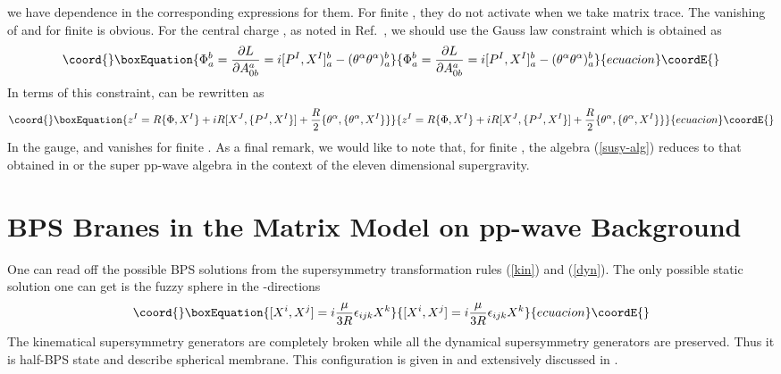 \documentclass[a4paper,12pt]{article}
\begin{document}
we have \coordHE{} dependence in the corresponding expressions for them.  For
finite \coordHE{}, they do not activate when we take matrix trace.  The
vanishing of \coordHE{} and \coordHE{} for finite \coordHE{}
is obvious.  For the central charge \coordHE{}, as noted in
Ref.~\cite{ban157}, we should use the Gauss law constraint \myHighlight{$\Phi$}\coordHE{}
which is obtained as
\begin{equation}\coord{}\boxEquation{
\Phi_a^b = \frac{\partial L }{\partial A_{0b}^a} = i[ P^I, X^I
]_a^b - (\theta^\alpha \theta^\alpha)_a^b
}{
\Phi_a^b = \frac{\partial L }{\partial A_{0b}^a} = i[ P^I, X^I
]_a^b - (\theta^\alpha \theta^\alpha)_a^b
}{ecuacion}\coordE{}\end{equation}
In terms of this constraint, \coordHE{} can be rewritten as
\begin{equation}\coord{}\boxEquation{
z^I  = R \{ \Phi, X^I \} + i R [ X^J, \{ P^J, X^I \} ]
 + \frac{R}{2} \{ \theta^\alpha, \{ \theta^\alpha, X^I \}\}
}{
z^I  = R \{ \Phi, X^I \} + i R [ X^J, \{ P^J, X^I \} ]
 + \frac{R}{2} \{ \theta^\alpha, \{ \theta^\alpha, X^I \}\}
}{ecuacion}\coordE{}\end{equation}
In the \coordHE{} gauge, \coordHE{} and \coordHE{} vanishes for
finite \coordHE{}.  As a final remark, we would like to note that, for
finite \coordHE{}, the algebra (\ref{susy-alg}) reduces to that obtained
in \cite{das185} or the super pp-wave algebra \cite{hat002} in the
context of the eleven dimensional supergravity.



\section{BPS Branes in the Matrix Model on pp-wave Background}
\label{brane}

One can read off the possible BPS solutions from the supersymmetry
transformation rules (\ref{kin}) and (\ref{dyn}). The only
possible static solution one can get is the fuzzy sphere in the
\coordHE{}-directions\cite{ber021}
\begin{equation}\coord{}\boxEquation{
[ X^i, X^j ] = i {\mu \over 3R}\epsilon_{ijk} X^k
}{
[ X^i, X^j ] = i {\mu \over 3R}\epsilon_{ijk} X^k
}{ecuacion}\coordE{}\end{equation}
The kinematical supersymmetry generators are completely broken
while all the dynamical supersymmetry generators are preserved.
Thus it is half-BPS state and describe spherical membrane. This
configuration is given in \cite{ber021} and extensively discussed
in \cite{das185}.
\end{document}
